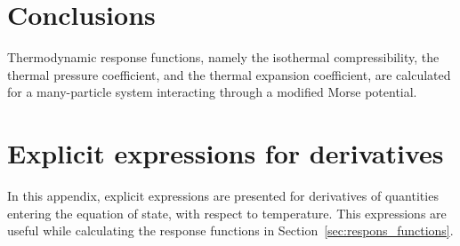 \documentclass[12pt]{article}
\begin{document}
	
	\section{Conclusions}
	Thermodynamic response functions, namely the isothermal compressibility, the thermal pressure coefficient, and the thermal expansion coefficient, are calculated for a many-particle system interacting through a modified Morse potential.
	
	\appendix
	\renewcommand{\theequation}{A.\arabic{equation}}
	\setcounter{equation}{0}
	
	\section{\label{sec:app-a} Explicit expressions for derivatives}
	In this appendix, explicit expressions are presented for derivatives of quantities entering the equation of state, with respect to temperature. This expressions are useful while calculating the response functions in Section~\ref{sec:respons_functions}.
	
\end{document}
